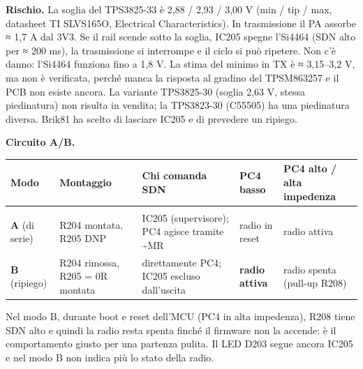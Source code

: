 \textbf{Rischio.} La soglia del TPS3825-33 è 2,88 /\allowbreak{} 2,93 /\allowbreak{} 3,00 V (min /\allowbreak{} tip /\allowbreak{} max, datasheet TI SLVS165O, Electrical Characteristics). In trasmissione il PA assorbe ≈ 1,7 A dal 3V3. Se il rail scende sotto la soglia, IC205 spegne l'Si4464 (SDN alto per ≈ 200 ms), la trasmissione si interrompe e il ciclo si può ripetere. Non c'è danno: l'Si4464 funziona fino a 1,8 V. La stima del minimo in TX è ≈ 3,15–3,2 V, ma non è verificata, perché manca la risposta al gradino del TPSM863257 e il PCB non esiste ancora. La variante TPS3825-30 (soglia 2,63 V, stessa piedinatura) non risulta in vendita; la TPS3823-30 (C55505) ha una piedinatura diversa. Brik81 ha scelto di lasciare IC205 e di prevedere un ripiego.

\textbf{Circuito A/\allowbreak{}B.}

{\footnotesize{}\setlength{\tabcolsep}{4pt}\renewcommand{\arraystretch}{1.1}
\begin{xltabular}{\linewidth}{>{\hsize\raggedright\arraybackslash}X>{\hsize\raggedright\arraybackslash}X>{\hsize\raggedright\arraybackslash}X>{\hsize\raggedright\arraybackslash}X>{\hsize\raggedright\arraybackslash}X}
\toprule
\textbf{Modo} & \textbf{Montaggio} & \textbf{Chi comanda SDN} & \textbf{PC4 basso} & \textbf{PC4 alto /\allowbreak{} alta impedenza} \\
\midrule
\endhead
\midrule[0.15pt]\\\bottomrule\endfoot
\bottomrule\endlastfoot
\textbf{A} (di serie) & R204 montata, R205 DNP & IC205 (supervisore); PC4 agisce tramite \textasciitilde{}MR & radio in reset & radio attiva \\\midrule[0.15pt]
\textbf{B} (ripiego) & R204 rimossa, R205 = 0R montata & direttamente PC4; IC205 escluso dall'uscita & \textbf{radio attiva} & radio spenta (pull-up R208) \\
\end{xltabular}}

Nel modo B, durante boot e reset dell'MCU (PC4 in alta impedenza), R208 tiene SDN alto e quindi la radio resta spenta finché il firmware non la accende: è il comportamento giusto per una partenza pulita. Il LED D203 segue ancora IC205 e nel modo B non indica più lo stato della radio.


